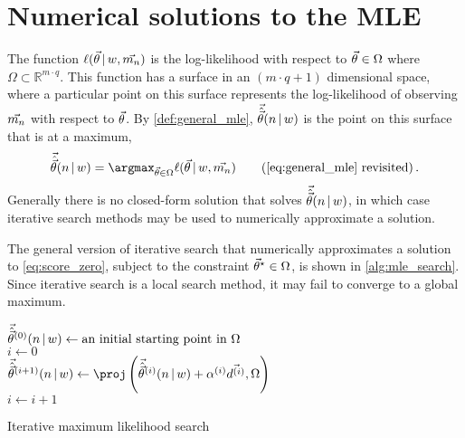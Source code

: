 \documentclass[../main.tex]{subfiles}
\begin{document}
\chapter{Numerical solutions to the MLE}
\label{appendix:numerical_solution}
The function $\ell(\vec{\theta} {\,|\,} w, \vec{m_n})$ is the log-likelihood with respect to $\vec{\theta} \in \Omega$ where $\Omega \subset \mathbb{R}^{m \cdot q}$. This function has a surface in an $(m \cdot q+1)$ dimensional space, where a particular point on this surface represents the log-likelihood of observing $\vec{m_n}$ with respect to $\vec{\theta}$. By \cref{def:general_mle}, $\vec{\hat{\vec{\theta}}}(n {\,|\,} w)$ is the point on this surface that is at a maximum,
\begin{equation*}
    \mle = \argmax_{\sysparamvec \in \Omega} \ell(\sysparamvec \given w, \mfso)
    \tag{\ref{eq:general_mle} revisited}\,.
\end{equation*}
Generally there is no closed-form solution that solves $\vec{\hat{\vec{\theta}}}(n {\,|\,} w)$, in which case iterative search methods may be used to numerically approximate a solution.

The general version of iterative search that numerically approximates a solution to \cref{eq:score_zero}, subject to the constraint ${\vec{\theta}}^{\star} \in \Omega$, is shown in \cref{alg:mle_search}. Since iterative search is a local search method, it may fail to converge to a global maximum.
\begin{algorithm}[h]
\DontPrintSemicolon
{}
\BlankLine
{}
\func{$\findmle${}{$(\mfso)$}}
{
    $\vec{\hat{\vec{\theta}}}^{(0)}(n {\,|\,} w) \gets \text{an initial starting point in $\Omega$}$\\
    $i \gets 0$\\
    {
        $\mlei{i+1} \gets \proj\left(\mlei{i} + \alpha^{(i)} \vec{d^{(i)}}, \Omega\right)$\\
        $i \gets i + 1$\\
    }
}
\caption{Iterative maximum likelihood search}
\label{alg:mle_search}
\end{algorithm}
\end{document}
